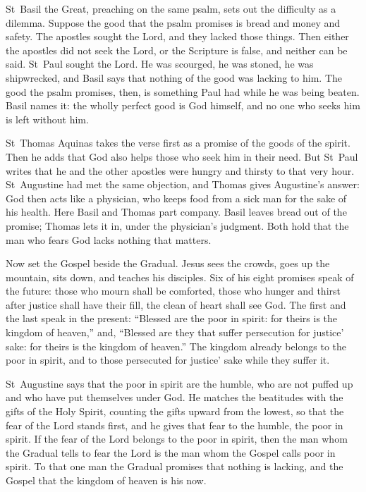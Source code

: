 St~Basil the Great, preaching on the same psalm, sets out the difficulty as a
dilemma. Suppose the good that the psalm promises is bread and money and
safety. The apostles sought the Lord, and they lacked those things. Then
either the apostles did not seek the Lord, or the Scripture is false, and
neither can be said. St~Paul sought the Lord. He was scourged, he was stoned,
he was shipwrecked, and Basil says that nothing of the good was lacking to
him. The good the psalm promises, then, is something Paul had while he was
being beaten. Basil names it: the wholly perfect good is God himself, and no
one who seeks him is left without him.

St~Thomas Aquinas takes the verse first as a promise of the goods of the
spirit. Then he adds that God also helps those who seek him in their need.
But St~Paul writes that he and the other apostles were hungry and thirsty to
that very hour. St~Augustine had met the same objection, and Thomas gives
Augustine's answer: God then acts like a physician, who keeps food from a
sick man for the sake of his health. Here Basil and Thomas part company.
Basil leaves bread out of the promise; Thomas lets it in, under the
physician's judgment. Both hold that the man who fears God lacks nothing
that matters.

Now set the Gospel beside the Gradual. Jesus sees the crowds, goes up the
mountain, sits down, and teaches his disciples. Six of his eight promises
speak of the future: those who mourn shall be comforted, those who hunger and
thirst after justice shall have their fill, the clean of heart shall see God.
The first and the last speak in the present: ``Blessed are the poor in
spirit: for theirs is the kingdom of heaven,'' and, ``Blessed are they that
suffer persecution for justice' sake: for theirs is the kingdom of heaven.''
The kingdom already belongs to the poor in spirit, and to those persecuted for
justice' sake while they suffer it.

St~Augustine says that the poor in spirit are the humble, who are not puffed
up and who have put themselves under God. He matches the beatitudes with the
gifts of the Holy Spirit, counting the gifts upward from the lowest, so that
the fear of the Lord stands first, and he gives that fear to the humble, the
poor in spirit. If the fear of the Lord belongs to the poor in spirit, then
the man whom the Gradual tells to fear the Lord is the man whom the Gospel
calls poor in spirit. To that one man the Gradual promises that nothing is
lacking, and the Gospel that the kingdom of heaven is his now.

